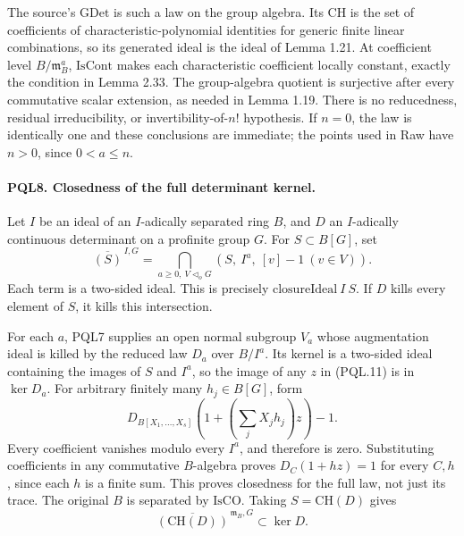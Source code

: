 The source's \(\mathrm{GDet}\) is such a law on the group
algebra. Its \(\mathrm{CH}\) is the set of coefficients of
characteristic-polynomial identities for generic finite
linear combinations, so its generated ideal is the ideal
of Lemma 1.21. At coefficient level \(B/\mathfrak m_B^a\),
\(\mathrm{IsCont}\) makes each characteristic coefficient
locally constant, exactly the condition in Lemma 2.33.
The group-algebra quotient is surjective after every
commutative scalar extension, as needed in Lemma 1.19.
There is no reducedness, residual irreducibility, or
invertibility-of-\(n!\) hypothesis. If \(n=0\), the law
is identically one and these conclusions are immediate;
the points used in Raw have \(n>0\), since \(0<a\leq n\).

\paragraph{PQL8. Closedness of the full determinant kernel.}
\label{claim:PQL8}
Let \(I\) be an ideal of an \(I\)-adically separated ring
\(B\), and \(D\) an \(I\)-adically continuous determinant
on a profinite group \(G\). For \(S\subset B[G]\), set
\[
 \overline{(S)}^{\,I,G}
 =\bigcap_{a\geq0,\ V\triangleleft_oG}
       (S,\ I^a,\ [v]-1\ (v\in V)).                 \tag{PQL.11}
\]
Each term is a two-sided ideal. This is precisely
\(\mathrm{closureIdeal}\ I\ S\).
If \(D\) kills every element of \(S\), it kills this intersection.

For each \(a\), PQL7 supplies an open normal subgroup
\(V_a\) whose augmentation ideal is killed by the reduced
law \(D_a\) over \(B/I^a\). Its kernel is a two-sided
ideal containing the images of \(S\) and \(I^a\), so the
image of any \(z\) in (PQL.11) is in \(\ker D_a\).
For arbitrary finitely many \(h_j\in B[G]\), form
\[
 D_{B[X_1,\ldots,X_s]}
       \left(1+\left(\sum_j X_jh_j\right)z\right)-1 .
                                                            \tag{PQL.12}
\]
Every coefficient vanishes modulo every \(I^a\), and
therefore is zero. Substituting coefficients in any
commutative \(B\)-algebra proves \(D_C(1+hz)=1\)
for every \(C,h\), since each \(h\) is a finite sum.
This proves closedness for the full law, not just its trace.
The original \(B\) is separated by \(\mathrm{IsCO}\).
Taking \(S=\mathrm{CH}(D)\) gives
\[
 \overline{(\mathrm{CH}(D))}^{\,\mathfrak m_B,G}
                                      \subset\ker D.        \tag{PQL.13}
\]

